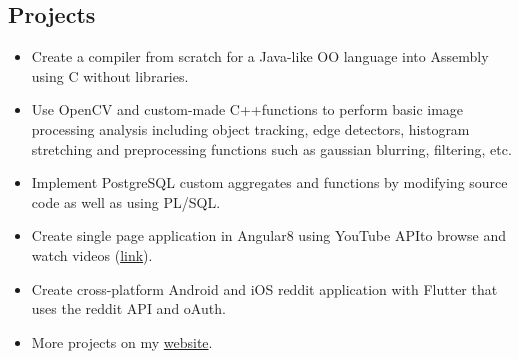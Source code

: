 \documentclass[2pt]{resume}
\begin{document}
\subsection{Projects}
\begin{itemize}
\item \small Create a compiler from scratch for a Java-like OO language into Assembly using C without libraries.
\item \small Use OpenCV and custom-made C++functions to perform basic image processing analysis including object tracking, edge detectors, histogram stretching and preprocessing functions such as gaussian blurring, filtering, etc.
\item \small Implement PostgreSQL custom aggregates and functions by modifying source code as well as using PL/SQL.
\item \small Create single page application in Angular8 using YouTube APIto browse and watch videos (\href{https://github.com/mushfiq814/youtube-data-api-dogVids}{link}).
\item \small Create cross-platform Android and iOS reddit application with Flutter that uses the reddit API and oAuth.
\item \small More projects on my \href{https://mushfiqmahmud.com/html/projects}{website}.
\end{itemize}

\end{document}
